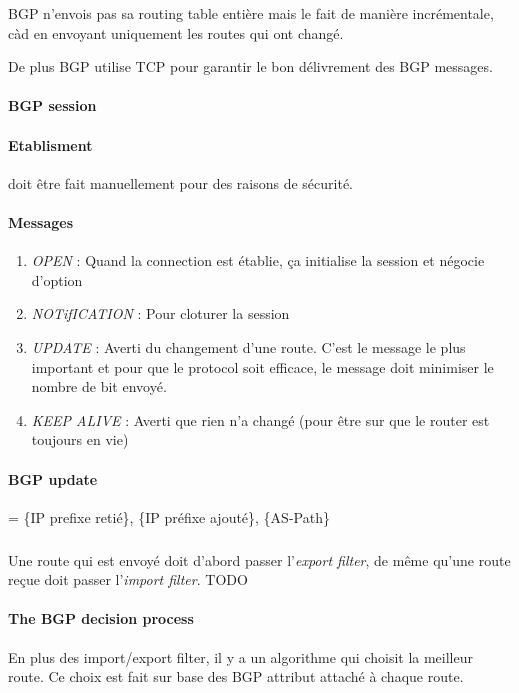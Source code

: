 BGP n'envois pas sa routing table entière mais le fait de manière incrémentale, càd en
envoyant uniquement les routes qui ont changé.

De plus BGP utilise TCP pour garantir le bon délivrement des BGP messages.

\paragraph{BGP session}

\paragraph{Etablisment} doit être fait manuellement pour des raisons de sécurité.

\paragraph{Messages}

\begin{enumerate}
    \item \textit{OPEN} : Quand la connection est établie, ça initialise la session et
        négocie d'option
    \item \textit{NOTifICATION} : Pour cloturer la session
    \item \textit{UPDATE} : Averti du changement d'une route. C'est le message le plus important et pour que le protocol soit efficace, le message doit minimiser le nombre de bit envoyé.
    \item \textit{KEEP ALIVE} : Averti que rien n'a changé (pour être sur que le router
        est toujours en vie)
\end{enumerate}

\paragraph{BGP update} = \{IP prefixe retié\}, \{IP préfixe ajouté\}, \{AS-Path\}

\subparagraph{ } Une route qui est envoyé doit d'abord passer l'\textit{export filter},
de même qu'une route reçue doit passer l'\textit{import filter}.
TODO

\paragraph{The BGP decision process}
En plus des import/export filter, il y a un algorithme qui choisit la meilleur route.
Ce choix est fait sur base des BGP attribut attaché à chaque route.

